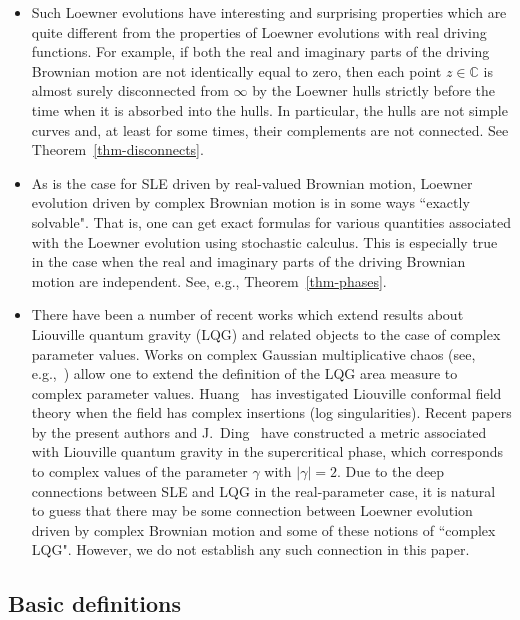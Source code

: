 \documentclass[11pt]{article}
\theoremstyle{plain}
\theoremstyle{definition}
\numberwithin{equation}{section}
\begin{document}
\begin{itemize}
\item Such Loewner evolutions have interesting and surprising properties which are quite different from the properties of Loewner evolutions with real driving functions. For example, if both the real and imaginary parts of the driving Brownian motion are not identically equal to zero, then each point $z\in\mathbb C$ is almost surely disconnected from $\infty$ by the Loewner hulls strictly before the time when it is absorbed into the hulls. In particular, the hulls are not simple curves and, at least for some times, their complements are not connected. See Theorem~\ref{thm-disconnects}. 
\item As is the case for SLE driven by real-valued Brownian motion, Loewner evolution driven by complex Brownian motion is in some ways ``exactly solvable". That is, one can get exact formulas for various quantities associated with the Loewner evolution using stochastic calculus. This is especially true in the case when the real and imaginary parts of the driving Brownian motion are independent. See, e.g., Theorem~\ref{thm-phases}.
\item There have been a number of recent works which extend results about Liouville quantum gravity (LQG) and related objects to the case of complex parameter values. Works on complex Gaussian multiplicative chaos (see, e.g.,~\cite{rhodes-vargas-complex-gmt,jsw-imaginary-gmc,jsw-decompositions,lacoin-complex-gmc}) allow one to extend the definition of the LQG area measure to complex parameter values. Huang~\cite{huang-complex-insertion} has investigated Liouville conformal field theory when the field has complex insertions (log singularities). Recent papers by the present authors and J.\ Ding~\cite{dg-supercritical-lfpp,pfeffer-supercritical-lqg,dg-confluence,dg-uniqueness} have constructed a metric associated with Liouville quantum gravity in the supercritical phase, which corresponds to complex values of the parameter $\gamma$ with $|\gamma|=2$. Due to the deep connections between SLE and LQG in the real-parameter case, it is natural to guess that there may be some connection between Loewner evolution driven by complex Brownian motion and some of these notions of ``complex LQG". However, we do not establish any such connection in this paper.  
\end{itemize}


\subsection{Basic definitions}
\end{document}
